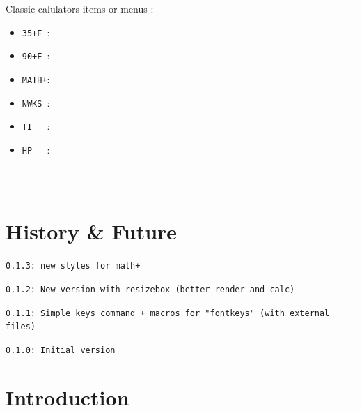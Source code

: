 \documentclass[11pt,a4paper]{ltxdoc}
\begin{document}
\begin{tcolorbox}[colframe=lightgray,colback=lightgray!5]
Classic calulators items or menus :

\begin{itemize}
	\item \texttt{35+E~}: 
	\item \texttt{90+E~}: 
	\item \texttt{MATH+}: 
	\item \texttt{NWKS~}: 
	\item \texttt{TI~~~}: 
	\item \texttt{HP~~~}: 
\end{itemize}
\end{tcolorbox}

\vfill~

\hrule

\vspace*{5mm}

\pagebreak


\hypertarget{matoc}{}

\tableofcontents

\vspace*{5mm}

\vfill

\section{History \& Future}

\texttt{0.1.3: new styles for math+}

\texttt{0.1.2: New version with resizebox (better render and calc)}

\texttt{0.1.1: Simple keys command + macros for "fontkeys" (with external files)}

\texttt{0.1.0: Initial version}

\vspace*{5mm}


\pagebreak

\section{Introduction}
\end{document}

